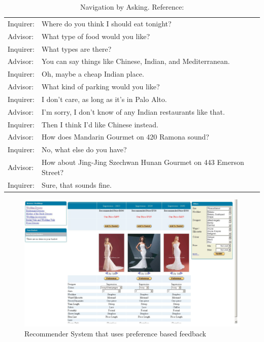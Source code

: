 \begin{table}
\caption{Navigation by Asking. Reference:\cite{thompson04}}
\centering
\renewcommand{\arraystretch}{1.5}
\label{tab:navAsking}

\begin{tabular}{ll}
Inquirer:&  Where do you think I should eat tonight?\\
Advisor: &  What type of food would you like? \\
Inquirer:&  What types are there? \\
Advisor: & You can say things like Chinese, Indian, and Mediterranean. \\
Inquirer:&  Oh, maybe a cheap Indian place. \\
Advisor:&  What kind of parking would you like? \\
Inquirer:&  I don't care, as long as it's in Palo Alto. \\
Advisor:&  I'm sorry, I don't know of any Indian restaurants like that. \\
Inquirer:&  Then I think I'd like Chinese instead. \\
Advisor:&  How does Mandarin Gourmet on 420 Ramona sound? \\
Inquirer:&  No, what else do you have? \\
Advisor:&  How about Jing-Jing Szechwan Hunan Gourmet on 443 Emerson Street? \\
Inquirer:&  Sure, that sounds fine.\\
\end{tabular}

\end{table}

\begin{figure}
    \includegraphics[width=1.0\textwidth]{figures-bharath/pbf.png}
  \caption{Recommender System that uses preference based feedback}
  \centering
\label{fig:pbf2}
\end{figure}



